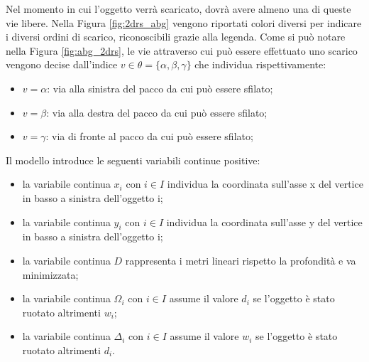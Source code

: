 Nel momento in cui l'oggetto verrà scaricato, dovrà avere almeno una di queste vie libere.
Nella Figura \ref{fig:2drs_abg} vengono riportati colori diversi per indicare i diversi ordini di scarico, riconoscibili grazie alla legenda.
Come si può notare nella Figura \ref{fig:abg_2drs}, le vie attraverso cui può essere effettuato uno scarico vengono decise dall'indice $v \in \theta = \{\alpha,\beta,\gamma\}$ che individua rispettivamente:
\begin{itemize}
	\item $v = \alpha$: via alla sinistra del pacco da cui può essere sfilato; 
	\item $v = \beta$: via alla destra del pacco da cui può essere sfilato; 
	\item $v = \gamma$: via di fronte al pacco da cui può essere sfilato; 
\end{itemize}

Il modello introduce le seguenti variabili continue positive:
\begin{itemize}
	\item la variabile continua $x_{i}$ con $i \in I$ individua la coordinata sull'asse x del vertice in basso a sinistra dell'oggetto i;
	\item la variabile continua $y_{i}$ con $i \in I$ individua la coordinata sull'asse y del vertice in basso a sinistra dell'oggetto i;
	\item la variabile continua $D$ rappresenta i metri lineari rispetto la profondità e va minimizzata;
	\item la variabile continua $\Omega_{i}$ con $i \in I$ assume il valore $d_i$ se l'oggetto è stato ruotato altrimenti $w_i$;
	\item la variabile continua $\Delta_{i}$ con $i \in I$ assume il valore $w_i$ se l'oggetto è stato ruotato altrimenti $d_i$.
\end{itemize}

